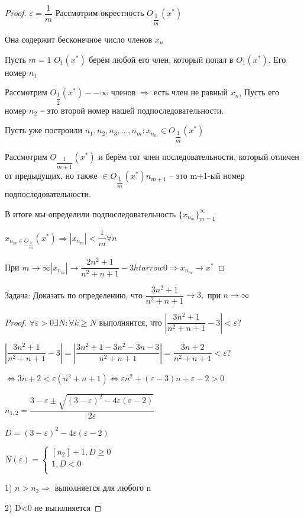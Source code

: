 \documentclass{book}
\begin{document}
\begin{proof}
	$\varepsilon = \dfrac{1}{m}$ Рассмотрим окрестность $O_{\dfrac{1}{m}}(x^*)$
	
	Она содержит бесконечное число членов $x_n$
	
	Пусть $m = 1$ $O_1(x^*)$ берём любой его член, который попал в $O_1(x^*)$. Его номер $n_1$
	
	Рассмотрим $O_{\dfrac{1}{2}}(x^*) -- \infty $ членов $\Rightarrow$ есть член не равный $x_n$, Пусть его номер $n_2$ -- это второй номер нашей подпоследовательности.
	
	Пусть уже построили $n_1, n_2, n_3, ..., n_m: x_{n_m} \in O_{\dfrac{1}{m}}(x^*)$
	
	Рассмотрим $O_{\dfrac{1}{m+1}}(x^*)$  и берём тот член последовательности, который отличен от предыдущих, но также $\in O_{\dfrac{1}{m}}(x^*)n_{m+1}$  -- это m+1-ый номер подпоследовательности.
	
	В итоге мы определили подпоследовательность  $\{x_{n_m}\}^{\infty}_{m =1}$
	
	$x_{n_m\in O_{\dfrac{1}{m } } } (x^*) \Rightarrow |x_{n_m}|<\dfrac{1}{m} \forall n$
	
	При $m\rightarrow \infty |x_{n_m}| \rightarrow\dfrac{2n^2+1}{n^2+n+1}-3htarrow 0 \Rightarrow x_{n_m}\rightarrow x^*$
\end{proof}


Задача: Доказать по определению, что $\dfrac{3n^2+1}{n^2+n+1}\rightarrow 3,$ при $n \rightarrow \infty$

\begin{proof}
	$\forall \varepsilon >0 \exists N: \forall k \geqslant N$ выполнянтся, что $| \dfrac{3n^2+1}{n^2+n+1}-3|<\varepsilon$?
	
	$| \dfrac{3n^2+1}{n^2+n+1}-3 | = |\dfrac{3n^2+1-3n^2-3n-3}{n^2+n+1}| = \dfrac{3n+2}{n^2+n+1}<\varepsilon$?
	
	$\Leftrightarrow 3n+2 < \varepsilon (n^2+n+1) \Leftrightarrow \varepsilon n^2+(\varepsilon-3)n + \varepsilon-2>0$
	
	$n_{1, 2}= \dfrac{3-\varepsilon\pm\sqrt{(3-\varepsilon)^2-4\varepsilon(\varepsilon-2)}}{2\varepsilon}$	
	
	$D = (3-\varepsilon)^2-4\varepsilon (\varepsilon-2)$
	
	$N(\varepsilon) = 
	\begin{cases}
		[n_2]+1, D\geqslant 0\\
		1, D<0\\
	\end{cases}
	$
	
	1) $n>n_2\Rightarrow$ выполняется для любого n
	
	2) D<0 не выполняется
	
\end{proof}
\end{document}
